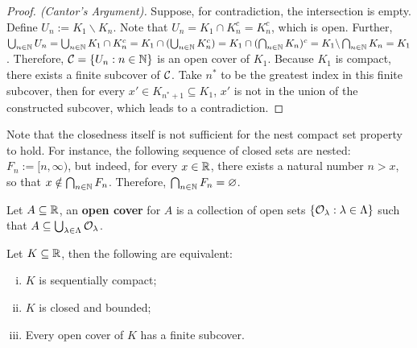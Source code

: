 \documentclass[11pt]{article}
\begin{document}
	\begin{proof}[Proof. (Cantor's Argument)]
		Suppose, for contradiction, the intersection is empty. Define $U_n := K_1 \backslash K_n$. Note that $U_n = K_1 \cap K_n^c = K_n^c$, which is open. Further, $\bigcup_{n \in \mathbb{N}} U_n = \bigcup_{n \in \mathbb{N}} K_1 \cap K_n^c = K_1 \cap (\bigcup_{n \in \mathbb{N}}K_n^c) = K_1 \cap (\bigcap_{n \in \mathbb{N}}K_n)^c = K_1 \backslash \bigcap_{n \in \mathbb{N}}K_n = K_1$. Therefore, $\mathcal{{C}} = \{U_n: n \in \mathbb{N}\}$ is an open cover of $K_1$. Because $K_1$ is compact, there exists a finite subcover of $\mathcal{{C}}$. Take $n^*$ to be the greatest index in this finite subcover, then for every $x' \in K_{n^*+1} \subseteq K_1$, $x'$ is not in the union of the constructed subcover, which leads to a contradiction.
	\end{proof}
	
	\begin{example}
		Note that the closedness itself is not sufficient for the nest compact set property to hold. For instance, the following sequence of closed sets are nested: $F_n := [n, \infty)$, but indeed, for every $x \in \mathbb{R}$, there exists a natural number $n > x$, so that $x \notin \bigcap_{n \in \mathbb{N}} F_n$. Therefore, $\bigcap_{n \in \mathbb{N}} F_n = \varnothing$.
	\end{example}
	
	\begin{definition}
		Let $A \subseteq \mathbb{R}$, an \textbf{open cover} for $A$ is a collection of open sets $\{\mathcal{{O}}_\lambda: \lambda \in \Lambda\}$ such that $A \subseteq \bigcup_{\lambda \in \Lambda} \mathcal{{O}}_\lambda$.
	\end{definition}
	
	\begin{theorem}
		Let $K \subseteq \mathbb{R}$, then the following are equivalent:
		\begin{enumerate}[(i)]
			\item $K$ is sequentially compact;
			\item $K$ is closed and bounded;
			\item Every open cover of $K$ has a finite subcover.
		\end{enumerate}
	\end{theorem}
	
\end{document}
